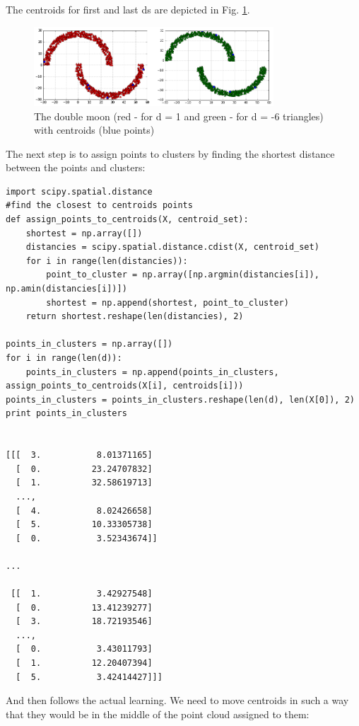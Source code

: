 \documentclass[a4paper, 12pt]{article}
\begin{document}
The centroids for first and last ds are depicted in Fig. \ref{fig:centr}.

\begin{figure}[h]
  \centering
  \caption{The double moon (red - for d = 1 and green - for d = -6 triangles) with centroids (blue points) \label{fig:centr}}
  \includegraphics[width=0.8\textwidth]{centr}
\end{figure}

The next step is to assign points to clusters by finding the shortest distance between the points and clusters:
\begin{lstlisting}
import scipy.spatial.distance
#find the closest to centroids points
def assign_points_to_centroids(X, centroid_set):
    shortest = np.array([])
    distancies = scipy.spatial.distance.cdist(X, centroid_set)
    for i in range(len(distancies)):
        point_to_cluster = np.array([np.argmin(distancies[i]), np.amin(distancies[i])])
        shortest = np.append(shortest, point_to_cluster)
    return shortest.reshape(len(distancies), 2)

points_in_clusters = np.array([])
for i in range(len(d)):
    points_in_clusters = np.append(points_in_clusters, assign_points_to_centroids(X[i], centroids[i]))
points_in_clusters = points_in_clusters.reshape(len(d), len(X[0]), 2)
print points_in_clusters


[[[  3.           8.01371165]
  [  0.          23.24707832]
  [  1.          32.58619713]
  ...,
  [  4.           8.02426658]
  [  5.          10.33305738]
  [  0.           3.52343674]]

...

 [[  1.           3.42927548]
  [  0.          13.41239277]
  [  3.          18.72193546]
  ...,
  [  0.           3.43011793]
  [  1.          12.20407394]
  [  5.           3.42414427]]]
\end{lstlisting}

And then follows the actual learning. We need to move centroids in such a way that they would 	be in the middle of the point cloud assigned to them:\\
\end{document}
